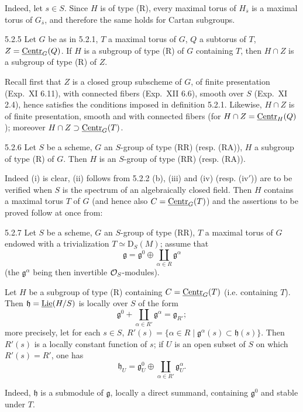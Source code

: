 {\renewcommand{\thefootnote}{(27)}}%
Indeed, let $s\in S$. Since $H$ is of type (R), every maximal torus of $H_{\overline s}$ is a maximal torus of $G_{\overline s}$, and therefore the same holds for Cartan subgroups.
\begin{proposition}{5.2.5}\label{XXII.5.2.5}
Let $G$ be as in 5.2.1, $T$ a maximal torus of $G$, $Q$ a subtorus of $T$, $Z=\underline{\mathrm{Centr}}_G(Q)$. If $H$ is a subgroup of type (R) of $G$ containing $T$, then $H\cap Z$ is a subgroup of type (R) of $Z$.
\end{proposition}
Recall first that $Z$ is a closed group subscheme of $G$, of finite presentation (Exp.~XI 6.11), with connected fibers (Exp.~XII 6.6), smooth over $S$ (Exp.~XI 2.4), hence satisfies the conditions imposed in definition 5.2.1. Likewise, $H\cap Z$ is of finite presentation, smooth and with connected fibers (for $H\cap Z=\underline{\mathrm{Centr}}_H(Q)$); moreover $H\cap Z\supset\underline{\mathrm{Centr}}_G(T)$.
\begin{proposition}{5.2.6}\label{XXII.5.2.6}
Let $S$ be a scheme, $G$ an $S$-group of type (RR) (resp. (RA)), $H$ a subgroup of type (R) of $G$. Then $H$ is an $S$-group of type (RR) (resp. (RA)).
\end{proposition}
Indeed (i) is clear, (ii) follows from 5.2.2 (b), (iii) and (iv) (resp. (iv$'$)) are to be verified when $S$ is the spectrum of an algebraically closed field. Then $H$ contains a maximal torus $T$ of $G$ (and hence also $C=\underline{\mathrm{Centr}}_G(T)${\renewcommand{\thefootnote}{(28)}}) and the assertions to be proved follow at once from:
\begin{lemma}{5.2.7}\label{XXII.5.2.7}
Let $S$ be a scheme, $G$ an $S$-group of type (RR), $T$ a maximal torus of $G$ endowed with a trivialization $T\simeq\mathrm D_S(M)$; assume that
\[
\mathfrak g=\mathfrak g^0\oplus\coprod_{\alpha\in R}\mathfrak g^\alpha
\]
(the $\mathfrak g^\alpha$ being then invertible $\mathcal{O}_S$-modules).

Let $H$ be a subgroup of type (R) containing $C=\underline{\mathrm{Centr}}_G(T)$ (i.e. containing $T$). Then $\mathfrak h=\underline{\operatorname{Lie}}(H/S)$ is locally over $S$ of the form
\[
\mathfrak g^0+\coprod_{\alpha\in R'}\mathfrak g^\alpha=\mathfrak g_{R'};
\]
more precisely, let for each $s\in S$, $R'(s)=\{\alpha\in R\mid\mathfrak g^\alpha(s)\subset\mathfrak h(s)\}$. Then $R'(s)$ is a locally constant function of $s$; if $U$ is an open subset of $S$ on which $R'(s)=R'$, one has
\[
\mathfrak h_U=\mathfrak g_U^0\oplus\coprod_{\alpha\in R'}\mathfrak g_U^\alpha.
\]
\end{lemma}
Indeed, $\mathfrak h$ is a submodule of $\mathfrak g$, locally a direct summand, containing $\mathfrak g^0$ and stable under $T$.

